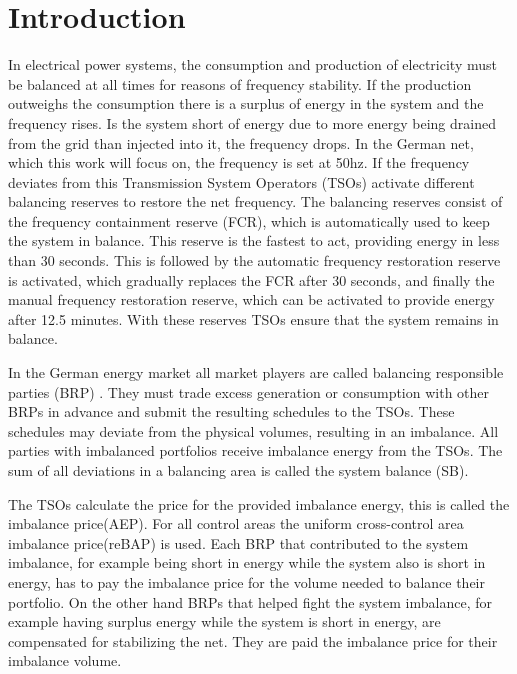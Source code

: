 \documentclass[class=scrbook, crop=false]{standalone}
\begin{document}
\chapter{Introduction}
\label{Chapter::Introduction}

In electrical power systems, the consumption and production of electricity must be balanced at all times for reasons of frequency stability\cite{weitemeyer2015integration}. If the production outweighs the consumption there is a surplus of energy in the system and the frequency rises. Is the system short of energy due to more energy being drained from the grid than injected into it, the frequency drops.
In the German net, which this work will focus on, the frequency is set at 50hz. If the frequency deviates from this Transmission System Operators (TSOs) activate different balancing reserves to restore the net frequency. The balancing reserves consist of the frequency containment reserve (FCR), which is automatically used to keep the system in balance. This reserve is the fastest to act, providing energy in less than 30 seconds. This is followed by the automatic frequency restoration reserve is activated, which gradually replaces the FCR after 30 seconds, and finally the manual frequency restoration reserve, which can be activated to provide energy after 12.5 minutes. With these reserves TSOs ensure that the system remains in balance\cite{netfrequency}.


In the German energy market all market players are called balancing responsible parties (BRP) \cite{narajewski2022probabilistic}. 
They must trade excess generation or consumption with other BRPs in advance and submit the resulting schedules to the TSOs. 
These schedules may deviate from the physical volumes, resulting in an imbalance. All parties with imbalanced portfolios receive imbalance energy from the TSOs. 
The sum of all deviations in a balancing area is called the system balance (SB)\cite{EICKE2021105455}.

The TSOs calculate the price for the provided imbalance energy, this is called the imbalance price(AEP). For all control areas the uniform cross-control area imbalance price(reBAP) is used. 
Each BRP that contributed to the system imbalance, for example being short in energy while the system also is short in energy, has to pay the imbalance price for the volume needed to balance their portfolio. On the other hand BRPs that helped fight the system imbalance, for example having surplus energy while the system is short in energy, are compensated for stabilizing the net. They are paid the imbalance price for their imbalance volume\cite{EICKE2021105455}.
\end{document}
